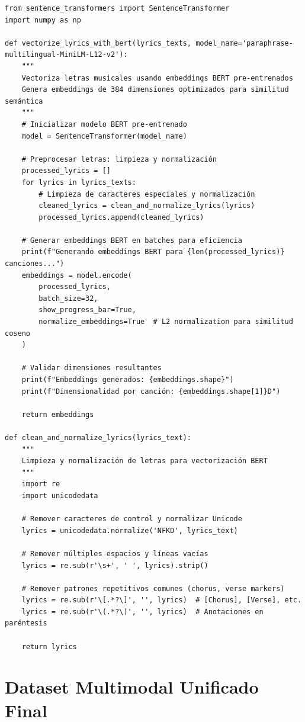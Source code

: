 \documentclass[12pt,a4paper]{report}
\begin{document}
\begin{lstlisting}[caption={Pipeline de Vectorización Semántica BERT}]
from sentence_transformers import SentenceTransformer
import numpy as np

def vectorize_lyrics_with_bert(lyrics_texts, model_name='paraphrase-multilingual-MiniLM-L12-v2'):
    """
    Vectoriza letras musicales usando embeddings BERT pre-entrenados
    Genera embeddings de 384 dimensiones optimizados para similitud semántica
    """
    # Inicializar modelo BERT pre-entrenado
    model = SentenceTransformer(model_name)

    # Preprocesar letras: limpieza y normalización
    processed_lyrics = []
    for lyrics in lyrics_texts:
        # Limpieza de caracteres especiales y normalización
        cleaned_lyrics = clean_and_normalize_lyrics(lyrics)
        processed_lyrics.append(cleaned_lyrics)

    # Generar embeddings BERT en batches para eficiencia
    print(f"Generando embeddings BERT para {len(processed_lyrics)} canciones...")
    embeddings = model.encode(
        processed_lyrics,
        batch_size=32,
        show_progress_bar=True,
        normalize_embeddings=True  # L2 normalization para similitud coseno
    )

    # Validar dimensiones resultantes
    print(f"Embeddings generados: {embeddings.shape}")
    print(f"Dimensionalidad por canción: {embeddings.shape[1]}D")

    return embeddings

def clean_and_normalize_lyrics(lyrics_text):
    """
    Limpieza y normalización de letras para vectorización BERT
    """
    import re
    import unicodedata

    # Remover caracteres de control y normalizar Unicode
    lyrics = unicodedata.normalize('NFKD', lyrics_text)

    # Remover múltiples espacios y líneas vacías
    lyrics = re.sub(r'\s+', ' ', lyrics).strip()

    # Remover patrones repetitivos comunes (chorus, verse markers)
    lyrics = re.sub(r'\[.*?\]', '', lyrics)  # [Chorus], [Verse], etc.
    lyrics = re.sub(r'\(.*?\)', '', lyrics)  # Anotaciones en paréntesis

    return lyrics
\end{lstlisting}

\section{Dataset Multimodal Unificado Final}
\end{document}
